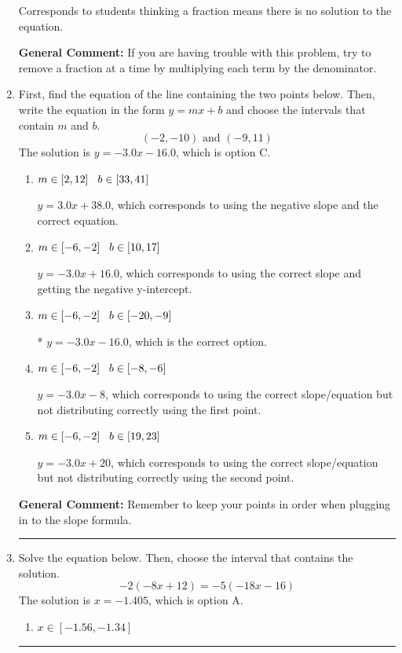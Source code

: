\documentclass{extbook}[14pt]
\newcommand{\litem}[1]{\item #1

\rule{\textwidth}{0.4pt}}
\begin{document}
\begin{enumerate}
{\begin{enumerate}[label=\Alph*.]
Corresponds to students thinking a fraction means there is no solution to the equation.
\end{enumerate}

\textbf{General Comment:} If you are having trouble with this problem, try to remove a fraction at a time by multiplying each term by the denominator.
}
\litem{
First, find the equation of the line containing the two points below. Then, write the equation in the form $ y=mx+b $ and choose the intervals that contain $m$ and $b$.
\[ (-2, -10) \text{ and } (-9, 11) \]The solution is \( y = -3.0x -16.0 \), which is option C.\begin{enumerate}[label=\Alph*.]
\item \( m \in [2, 12] \hspace*{3mm} b \in [33, 41] \)

 $y = 3.0x + 38.0$, which corresponds to using the negative slope and the correct equation.
\item \( m \in [-6, -2] \hspace*{3mm} b \in [10, 17] \)

 $y = -3.0x + 16.0$, which corresponds to using the correct slope and getting the negative y-intercept.
\item \( m \in [-6, -2] \hspace*{3mm} b \in [-20, -9] \)

* $y = -3.0x -16.0$, which is the correct option.
\item \( m \in [-6, -2] \hspace*{3mm} b \in [-8, -6] \)

 $y = -3.0x -8$, which corresponds to using the correct slope/equation but not distributing correctly using the first point.
\item \( m \in [-6, -2] \hspace*{3mm} b \in [19, 23] \)

 $y = -3.0x + 20$, which corresponds to using the correct slope/equation but not distributing correctly using the second point.
\end{enumerate}

\textbf{General Comment:} Remember to keep your points in order when plugging in to the slope formula.
}
\litem{
Solve the equation below. Then, choose the interval that contains the solution.
\[ -2(-8x + 12) = -5(-18x -16) \]The solution is \( x = -1.405 \), which is option A.\begin{enumerate}[label=\Alph*.]
\item \( x \in [-1.56, -1.34] \)


\end{enumerate}}
\end{enumerate}
\end{document}
